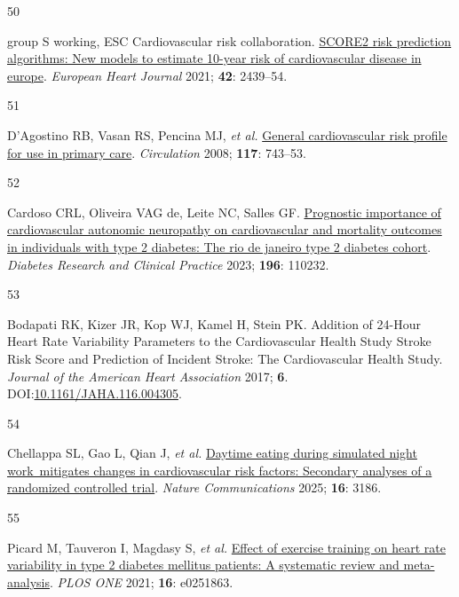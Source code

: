 \documentclass[
  a4paper,
  headsepline=true,
  open=any]{scrbook}
\newlength{\cslhangindent}
\newlength{\csllabelwidth}
\newlength{\cslentryspacingunit} %
\newenvironment{CSLReferences}[2] %
 {%
  \setlength{\parindent}{0pt}
  \ifodd #1
  \let\oldpar\par
  \def\par{\hangindent=\cslhangindent\oldpar}
  \fi
  \setlength{\parskip}{#2\cslentryspacingunit}
 }%
 {}
\newcommand{\CSLLeftMargin}[1]{\parbox[t]{\csllabelwidth}{#1}}
\newcommand{\CSLRightInline}[1]{\parbox[t]{\linewidth - \csllabelwidth}{#1}\break}
\begin{document}
\begin{CSLReferences}{0}{0}
\leavevmode{}%
\CSLLeftMargin{50 }%
\CSLRightInline{group S working, ESC Cardiovascular risk collaboration.
\href{https://doi.org/10.1093/eurheartj/ehab309}{SCORE2 risk prediction
algorithms: New models to estimate 10-year risk of cardiovascular
disease in europe}. \emph{European Heart Journal} 2021; \textbf{42}:
2439--54.}

\leavevmode{}%
\CSLLeftMargin{51 }%
\CSLRightInline{D'Agostino RB, Vasan RS, Pencina MJ, \emph{et al.}
\href{https://doi.org/10.1161/CIRCULATIONAHA.107.699579}{General
cardiovascular risk profile for use in primary care}. \emph{Circulation}
2008; \textbf{117}: 743--53.}

\leavevmode{}%
\CSLLeftMargin{52 }%
\CSLRightInline{Cardoso CRL, Oliveira VAG de, Leite NC, Salles GF.
\href{https://doi.org/10.1016/j.diabres.2022.110232}{Prognostic
importance of cardiovascular autonomic neuropathy on cardiovascular and
mortality outcomes in individuals with type 2 diabetes: The rio de
janeiro type 2 diabetes cohort}. \emph{Diabetes Research and Clinical
Practice} 2023; \textbf{196}: 110232.}

\leavevmode{}%
\CSLLeftMargin{53 }%
\CSLRightInline{Bodapati RK, Kizer JR, Kop WJ, Kamel H, Stein PK.
Addition of 24-Hour Heart Rate Variability Parameters to the
Cardiovascular Health Study Stroke Risk Score and Prediction of Incident
Stroke: The Cardiovascular Health Study. \emph{Journal of the American
Heart Association} 2017; \textbf{6}.
DOI:\href{https://doi.org/10.1161/JAHA.116.004305}{10.1161/JAHA.116.004305}.}

\leavevmode{}%
\CSLLeftMargin{54 }%
\CSLRightInline{Chellappa SL, Gao L, Qian J, \emph{et al.}
\href{https://doi.org/10.1038/s41467-025-57846-y}{Daytime eating during
simulated night work~mitigates changes in cardiovascular risk factors:
Secondary analyses of a randomized controlled trial}. \emph{Nature
Communications} 2025; \textbf{16}: 3186.}

\leavevmode{}%
\CSLLeftMargin{55 }%
\CSLRightInline{Picard M, Tauveron I, Magdasy S, \emph{et al.}
\href{https://doi.org/10.1371/journal.pone.0251863}{Effect of exercise
training on heart rate variability in type 2 diabetes mellitus patients:
A systematic review and meta-analysis}. \emph{PLOS ONE} 2021;
\textbf{16}: e0251863.}


\end{CSLReferences}
\end{document}
